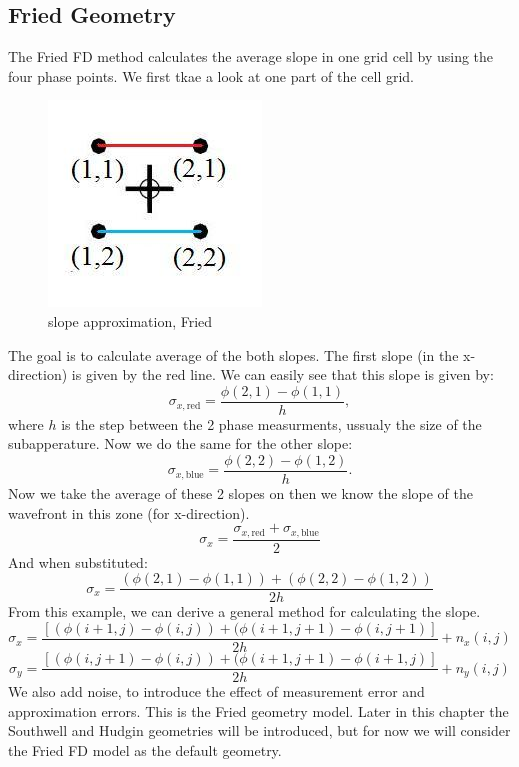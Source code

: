 \documentclass{article}
\begin{document}
\subsection{Fried Geometry}
The Fried FD method calculates the average slope in one grid cell by using the four phase points. We first tkae a look at one part of the cell grid.
\begin{figure}[h!]
  \centering
  \includegraphics[scale=0.6]{figures/fried}
  \caption{slope approximation, Fried}
\end{figure}
\newpage
\noindent The goal is to calculate average of the both slopes. The first slope (in the x-direction) is given by the red line. We can easily see that this slope is given by:
$$ \sigma_{x,\text{red}} = \frac{\phi(2,1) - \phi(1,1)}{h}, $$
where $h$ is the step between the 2 phase measurments, ussualy the size of the subapperature.
Now we do the same for the other slope:
$$ \sigma_{x,\text{blue}} = \frac{\phi(2,2) - \phi(1,2)}{h}. $$
Now we take the average of these 2 slopes on then we know the slope of the wavefront in this zone (for x-direction).
$$ \sigma_x = \frac{\sigma_{x,\text{red}}+\sigma_{x,\text{blue}}}{2}$$
And when substituted:
$$ \sigma_x = \frac{(\phi(2,1) - \phi(1,1))+(\phi(2,2) - \phi(1,2))}{2h}$$
From this example, we can derive a general method for calculating the slope. 
$$ \sigma_x = \frac{[(\phi(i+1,j)-\phi(i,j))+(\phi(i+1,j+1)-\phi(i,j+1)]}{2h} + n_x(i,j)$$
$$ \sigma_y = \frac{[(\phi(i,j+1)-\phi(i,j))+(\phi(i+1,j+1)-\phi(i+1,j)]}{2h} + n_y(i,j)$$
We also add noise, to introduce the effect of measurement error and approximation errors.
This is the Fried geometry model. Later in this chapter the Southwell and Hudgin geometries will be introduced, but for now we will consider the Fried FD model as the default geometry.
\end{document}
